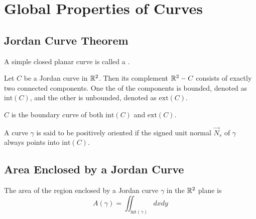 \documentclass[11pt]{penrose}
\newcommand{\vN}{\vec{N}}
\renewcommand{\interior}[1]{\mathrm{int}(#1)}
\newcommand{\exterior}[1]{\mathrm{ext}(#1)}
\begin{document}
\section{Global Properties of Curves}
\subsection{Jordan Curve Theorem}

\begin{ndfn}
    A simple closed planar curve is called a .
\end{ndfn}

\begin{nthm}
    Let $C$ be a Jordan curve in $\mathbb{R}^2$. Then its complement $\mathbb{R}^2 - C$ consists of exactly two connected components. One the of the components is bounded, denoted as $\interior{C}$, and the other is unbounded, denoted as $\exterior{C}$.
\end{nthm}

$C$ is the boundary curve of both $\interior{C}$ and $\exterior{C}$.

\begin{ndfn}
    A curve $\gamma$ is said to be positively oriented if the signed unit normal $\vN_s$ of $\gamma$ always points into $\interior{C}$.
\end{ndfn}

\subsection{Area Enclosed by a Jordan Curve}
The area of the region enclosed by a Jordan curve $\gamma$ in the $\mathbb{R}^2$ plane is
\begin{equation}
    A(\gamma) = \iint_{\interior{\gamma}} dxdy
\end{equation}
\end{document}
